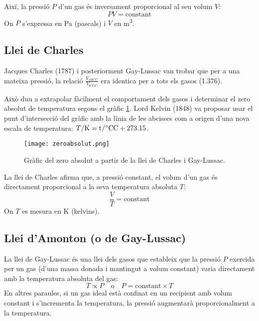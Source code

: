 Així, la pressió \( P \) d'un gas és inversament proporcional al seu volum \( V \):
\begin{equation}
    P V = \text{constant}
\end{equation}
On \( P \) s'expressa en \si{Pa} (pascals) i \( V \) en \si{m^3}.

\subsection{Llei de Charles}

Jacques Charles (1787) i posteriorment Gay-Lussac van trobar que per a una mateixa pressió, la relació $\frac{V_{100 \si\degreeCelsius}}{V_{0 \si\degreeCelsius C}}$ era identica per a tots els gasos (1.376).

Això duu a extrapolar fàcilment el comportament dels gasos i determinar el zero absolut de temperatura segons el gràfic \ref{fig:zeroabsolut}. Lord Kelvin (1848) va proposar usar el punt d'intersecció del gràfic amb la línia de les abcisses com a origen d'una nova escala de temperatura: $T/\rm{K} = t/\si\degreeCelsius \rm{C} + 273.15$.
\begin{figure}[h]
\centering
\texttt{[image: zeroabsolut.png]}
\caption{Gràfic del zero absolut a partir de la llei de Charles i Gay-Lussac.}
\label{fig:zeroabsolut}
\end{figure}

La llei de Charles afirma que, a pressió constant, el volum d'un gas és directament proporcional a la seva temperatura absoluta \( T \):
\begin{equation}
    \frac{V}{T} = \text{constant}
\end{equation}
On \( T \) es mesura en \si{K} (kelvins).

\subsection{Llei d'Amonton (o de Gay-Lussac)}
La llei de Gay-Lussac és una llei dels gasos que estableix que la pressió \( P \) exercida per un gas (d'una massa donada i mantingut a volum constant) varia directament amb la temperatura absoluta del gas:
\begin{equation}
    T \propto P \quad \text{o} \quad P = \text{constant} \times T
\end{equation}
En altres paraules, si un gas ideal està confinat en un recipient amb volum constant i s'incrementa la temperatura, la pressió augmentarà proporcionalment a la temperatura.

